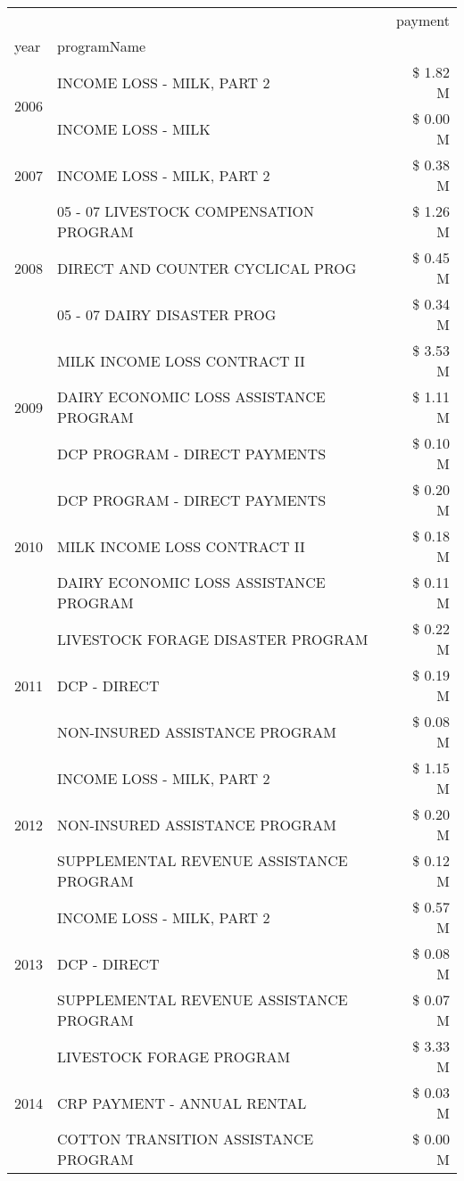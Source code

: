\begin{tabular}{llr}
\toprule
 &  & payment \\
year & programName &  \\
\midrule
\multirow[t]{2}{*}{2006} & INCOME LOSS - MILK, PART 2 & \$ 1.82 M \\
 & INCOME LOSS - MILK & \$ 0.00 M \\
\cline{1-3}
2007 & INCOME LOSS - MILK, PART 2 & \$ 0.38 M \\
\cline{1-3}
\multirow[t]{3}{*}{2008} & 05 - 07 LIVESTOCK COMPENSATION PROGRAM & \$ 1.26 M \\
 & DIRECT AND COUNTER CYCLICAL PROG & \$ 0.45 M \\
 & 05 - 07 DAIRY DISASTER PROG & \$ 0.34 M \\
\cline{1-3}
\multirow[t]{3}{*}{2009} & MILK INCOME LOSS CONTRACT II & \$ 3.53 M \\
 & DAIRY ECONOMIC LOSS ASSISTANCE PROGRAM & \$ 1.11 M \\
 & DCP PROGRAM - DIRECT PAYMENTS & \$ 0.10 M \\
\cline{1-3}
\multirow[t]{3}{*}{2010} & DCP PROGRAM - DIRECT PAYMENTS & \$ 0.20 M \\
 & MILK INCOME LOSS CONTRACT II & \$ 0.18 M \\
 & DAIRY ECONOMIC LOSS ASSISTANCE PROGRAM & \$ 0.11 M \\
\cline{1-3}
\multirow[t]{3}{*}{2011} & LIVESTOCK FORAGE DISASTER PROGRAM & \$ 0.22 M \\
 & DCP - DIRECT & \$ 0.19 M \\
 & NON-INSURED ASSISTANCE PROGRAM & \$ 0.08 M \\
\cline{1-3}
\multirow[t]{3}{*}{2012} & INCOME LOSS - MILK, PART 2 & \$ 1.15 M \\
 & NON-INSURED ASSISTANCE PROGRAM & \$ 0.20 M \\
 & SUPPLEMENTAL REVENUE ASSISTANCE PROGRAM & \$ 0.12 M \\
\cline{1-3}
\multirow[t]{3}{*}{2013} & INCOME LOSS - MILK, PART 2 & \$ 0.57 M \\
 & DCP - DIRECT & \$ 0.08 M \\
 & SUPPLEMENTAL REVENUE ASSISTANCE PROGRAM & \$ 0.07 M \\
\cline{1-3}
\multirow[t]{3}{*}{2014} & LIVESTOCK FORAGE PROGRAM & \$ 3.33 M \\
 & CRP PAYMENT - ANNUAL RENTAL & \$ 0.03 M \\
 & COTTON TRANSITION ASSISTANCE PROGRAM & \$ 0.00 M \\

\end{tabular}

